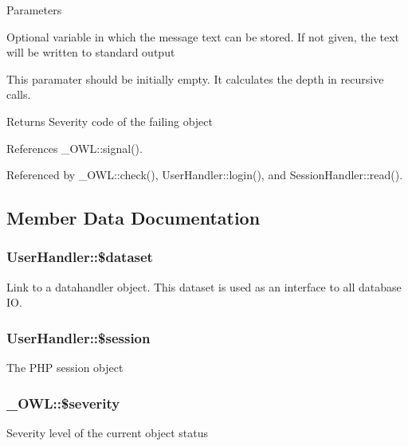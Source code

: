 \begin{DoxyParams}{Parameters}
\item[\mbox{\tt[out]} {\em \$text}]Optional variable in which the message text can be stored. If not given, the text will be written to standard output \item[\mbox{\tt[in]} {\em \$depth}]This paramater should be initially empty. It calculates the depth in recursive calls. \end{DoxyParams}
\begin{DoxyReturn}{Returns}
Severity code of the failing object 
\end{DoxyReturn}


References \_\-OWL::signal().



Referenced by \_\-OWL::check(), UserHandler::login(), and SessionHandler::read().



\subsection{Member Data Documentation}
\subsubsection[{\$dataset}]{\setlength{\rightskip}{0pt plus 5cm}UserHandler::\$dataset}\label{classUserHandler_ac38c1ea50b2820ed03781bdbe8eb2e08}
Link to a datahandler object. This dataset is used as an interface to all database IO. 
\subsubsection[{\$session}]{\setlength{\rightskip}{0pt plus 5cm}UserHandler::\$session}\label{classUserHandler_af097b7fd1ee085b46a6c34e071508a7f}
The PHP session object 
\subsubsection[{\$severity}]{\setlength{\rightskip}{0pt plus 5cm}\_\-OWL::\$severity}\label{class__OWL_ad26b40a9dbbacb33e299b17826f8327c}
Severity level of the current object status 
